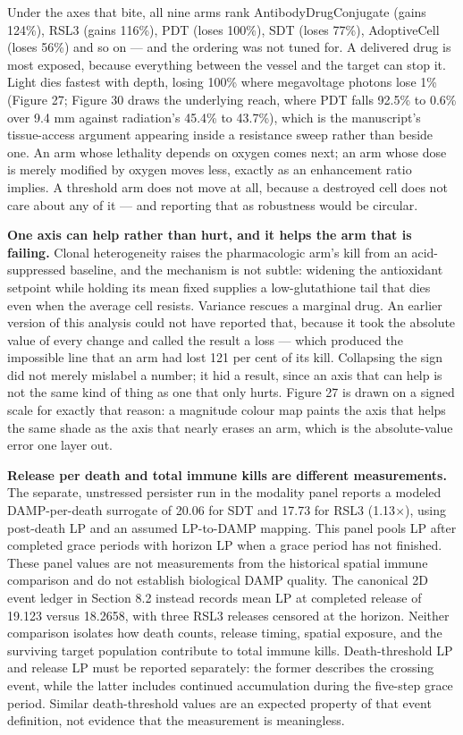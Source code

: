 \documentclass[11pt,twoside,openright]{report}
\begin{document}
Under the axes that bite, all nine arms rank AntibodyDrugConjugate (gains 124\%), RSL3 (gains 116\%), PDT (loses 100\%), SDT (loses 77\%), AdoptiveCell (loses 56\%) and so on --- and the ordering was not tuned for. A delivered drug is most exposed, because everything between the vessel and the target can stop it. Light dies fastest with depth, losing 100\% where megavoltage photons lose 1\% (Figure 27; Figure 30 draws the underlying reach, where PDT falls 92.5\% to 0.6\% over 9.4 mm against radiation's 45.4\% to 43.7\%), which is the manuscript's tissue-access argument appearing inside a resistance sweep rather than beside one. An arm whose lethality depends on oxygen comes next; an arm whose dose is merely modified by oxygen moves less, exactly as an enhancement ratio implies. A threshold arm does not move at all, because a destroyed cell does not care about any of it --- and reporting that as robustness would be circular.

\textbf{One axis can help rather than hurt, and it helps the arm that is failing.} Clonal heterogeneity raises the pharmacologic arm's kill from an acid-suppressed baseline, and the mechanism is not subtle: widening the antioxidant setpoint while holding its mean fixed supplies a low-glutathione tail that dies even when the average cell resists. Variance rescues a marginal drug. An earlier version of this analysis could not have reported that, because it took the absolute value of every change and called the result a loss --- which produced the impossible line that an arm had lost 121 per cent of its kill. Collapsing the sign did not merely mislabel a number; it hid a result, since an axis that can help is not the same kind of thing as one that only hurts. Figure 27 is drawn on a signed scale for exactly that reason: a magnitude colour map paints the axis that helps the same shade as the axis that nearly erases an arm, which is the absolute-value error one layer out.

\textbf{Release per death and total immune kills are different measurements.} The separate, unstressed persister run in the modality panel reports a modeled DAMP-per-death surrogate of 20.06 for SDT and 17.73 for RSL3 (1.13$\times$), using post-death LP and an assumed LP-to-DAMP mapping. This panel pools LP after completed grace periods with horizon LP when a grace period has not finished. These panel values are not measurements from the historical spatial immune comparison and do not establish biological DAMP quality. The canonical 2D event ledger in Section 8.2 instead records mean LP at completed release of 19.123 versus 18.2658, with three RSL3 releases censored at the horizon. Neither comparison isolates how death counts, release timing, spatial exposure, and the surviving target population contribute to total immune kills. Death-threshold LP and release LP must be reported separately: the former describes the crossing event, while the latter includes continued accumulation during the five-step grace period. Similar death-threshold values are an expected property of that event definition, not evidence that the measurement is meaningless.
\end{document}
